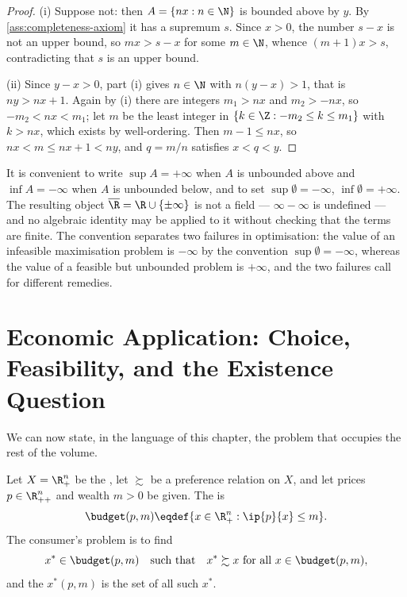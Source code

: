 \begin{proof}
	(i) Suppose not: then $A=\{nx : n\in\N\}$ is bounded above by $y$. By
	\autoref{ass:completeness-axiom} it has a supremum $s$. Since $x>0$, the number
	$s-x$ is not an upper bound, so $mx>s-x$ for some $m\in\N$, whence
	$(m+1)x>s$, contradicting that $s$ is an upper bound.

	(ii) Since $y-x>0$, part (i) gives $n\in\N$ with $n(y-x)>1$, that is
	$ny>nx+1$. Again by (i) there are integers $m_1>nx$ and $m_2>-nx$, so
	$-m_2<nx<m_1$; let $m$ be the least integer in $\{k\in\Z : -m_2\leq k\leq m_1\}$
	with $k>nx$, which exists by well-ordering. Then $m-1\leq nx$, so
	$nx<m\leq nx+1<ny$, and $q=m/n$ satisfies $x<q<y$.
\end{proof}

\begin{remark}\label{rem:extended-reals}
	It is convenient to write $\sup A=+\infty$ when $A$ is unbounded above and
	$\inf A=-\infty$ when $A$ is unbounded below, and to set
	$\sup\emptyset=-\infty$, $\inf\emptyset=+\infty$. The resulting object
	$\overline{\R}=\R\cup\{\pm\infty\}$ is not a field --- $\infty-\infty$ is
	undefined --- and no algebraic identity may be applied to it without checking
	that the terms are finite. The convention separates two failures in optimisation: the value of an
	infeasible maximisation problem is $-\infty$ by the convention
	$\sup\emptyset=-\infty$, whereas the value of a feasible but unbounded problem
	is $+\infty$, and the two failures call for different remedies.
\end{remark}

\section{Economic Application: Choice, Feasibility, and the Existence Question}
\label{sec:sets-preferences}

We can now state, in the language of this chapter, the problem that occupies the
rest of the volume.

\begin{eg}\label{eg:consumer-setup}
	Let $X=\R^n_+$ be the , let $\succsim$ be a preference
	relation on $X$, and let prices $p\in\R^n_{++}$ and wealth $m>0$ be given. The
	 is
	\[
		\budget(p,m)\eqdef\{x\in\R^n_+ : \ip{p}{x}\leq m\}.
	\]
	The consumer's problem is to find
	\[
		x^\ast\in\budget(p,m)\quad\text{such that}\quad
		x^\ast\succsim x\ \text{for all } x\in\budget(p,m),
	\]
	and the  $x^\ast(p,m)$ is the set of all such
	$x^\ast$.
\end{eg}

